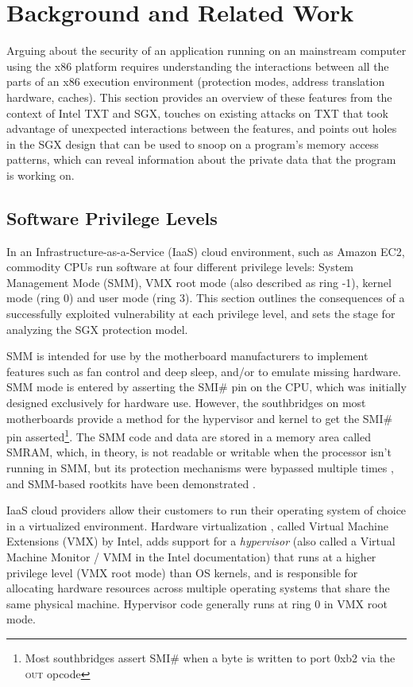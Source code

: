 \section{Background and Related Work}
\label{sec:background}

Arguing about the security of an application running on an mainstream computer
using the x86 platform requires understanding the interactions between
all the parts of an x86 execution environment (protection modes, address
translation hardware, caches). This section provides an overview of these
features from the context of Intel TXT and SGX, touches on existing attacks on
TXT that took advantage of unexpected interactions between the features, and
points out holes in the SGX design that can be used to snoop on a program's
memory access patterns, which can reveal information about the private data
that the program is working on.


\subsection{Software Privilege Levels}
\label{sec:rings}

In an Infrastructure-as-a-Service (IaaS) cloud environment, such as Amazon EC2,
commodity CPUs run software at four different privilege levels: System
Management Mode (SMM), VMX root mode (also described as ring -1), kernel mode
(ring 0) and user mode (ring 3). This section outlines the consequences of a
successfully exploited vulnerability at each privilege level, and sets the
stage for analyzing the SGX protection model.

SMM is intended for use by the motherboard manufacturers to implement features
such as fan control and deep sleep, and/or to emulate missing hardware. SMM
mode is entered by asserting the SMI\# pin on the CPU, which was initially
designed exclusively for hardware use. However, the southbridges on most
motherboards provide a method for the hypervisor and kernel to get the SMI\#
pin asserted\footnote{Most southbridges assert SMI\# when a byte is written to
port 0xb2 via the \textsc{out} opcode}. The SMM code and data are stored in a
memory area called SMRAM, which, in theory, is not readable or writable when
the processor isn't running in SMM, but its protection mechanisms were bypassed
multiple times \cite{duflot2006smm} \cite{rutkowska2008remap}
\cite{wojtczuk2009smm}, and SMM-based rootkits have been demonstrated
\cite{wecherowski2009smm} \cite{wecherowski2009smm}.

IaaS cloud providers allow their customers to run their operating system of
choice in a virtualized environment. Hardware virtualization
\cite{uhlig2005intel}, called Virtual Machine Extensions (VMX) by Intel,
adds support for a \textit{hypervisor} (also called a Virtual Machine Monitor
/ VMM in the Intel documentation) that runs at a higher privilege level
(VMX root mode) than OS kernels, and is responsible for allocating hardware
resources across multiple operating systems that share the same physical
machine. Hypervisor code generally runs at ring 0 in VMX root mode.

